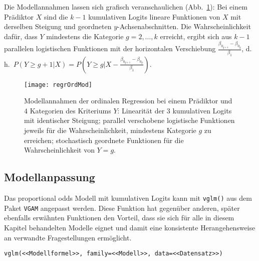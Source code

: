 Die Modellannahmen lassen sich grafisch veranschaulichen (Abb.\ \ref{fig:regrOrdMod}): Bei einem Prädiktor $X$ sind die $k-1$ kumulativen Logits lineare Funktionen von $X$ mit derselben Steigung und geordneten $y$-Achsenabschnitten. Die Wahrscheinlichkeit dafür, dass $Y$ mindestens die Kategorie $g = 2, \ldots, k$ erreicht, ergibt sich aus $k-1$ parallelen logistischen Funktionen mit der horizontalen Verschiebung $\frac{\beta_{0_{g+1}} - \beta_{0_{g}}}{\beta_{1}}$, d.\,h.\ $P(Y \geq g+1|X) = P(Y \geq g | X - \frac{\beta_{0_{g+1}} - \beta_{0_{g}}}{\beta_{1}})$.

\begin{figure}[ht]
\centering
\texttt{[image: regrOrdMod]}
\vspace*{-0.5em}
\caption{Modellannahmen der ordinalen Regression bei einem Prädiktor und $4$ Kategorien des Kriteriums $Y$: Linearität der $3$ kumulativen Logits mit identischer Steigung; parallel verschobene logistische Funktionen jeweils für die Wahrscheinlichkeit, mindestens Kategorie $g$ zu erreichen; stochastisch geordnete Funktionen für die Wahrscheinlichkeit von $Y=g$.}
\label{fig:regrOrdMod}
\end{figure}

\subsection{Modellanpassung}
\label{sec:regrOrdFit}

Das proportional odds Modell mit kumulativen Logits kann mit \lstinline!vglm()! aus dem Paket \lstinline!VGAM! \cite{Yee2010} angepasst werden. Diese Funktion hat gegenüber anderen, später ebenfalls erwähnten Funktionen den Vorteil, dass sie sich für alle in diesem Kapitel behandelten Modelle eignet und damit eine konsistente Herangehensweise an verwandte Fragestellungen ermöglicht.
\begin{lstlisting}
vglm(<<Modellformel>>, family=<<Modell>>, data=<<Datensatz>>)
\end{lstlisting}

